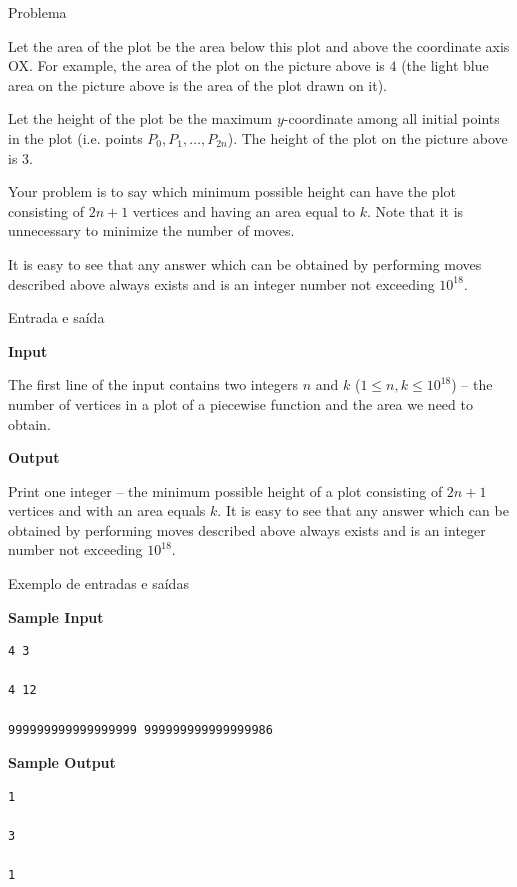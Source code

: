 \begin{frame}[fragile]{Problema}

Let the area of the plot be the area below this plot and above the coordinate axis OX. For example, the area of the plot on the picture above is $4$ (the light blue area on the picture above is the area of the plot drawn on it).

Let the height of the plot be the maximum $y$-coordinate among all initial points in the plot (i.e. points $P_0, P_1, \ldots, P_{2n}$). The height of the plot on the picture above is $3$.

Your problem is to say which minimum possible height can have the plot consisting of $2n+1$ vertices and having an area equal to $k$. Note that it is unnecessary to minimize the number of moves.

It is easy to see that any answer which can be obtained by performing moves described above always exists and is an integer number not exceeding $10^{18}$.

\end{frame}

\begin{frame}[fragile]{Entrada e saída}

\textbf{Input}

The first line of the input contains two integers $n$ and $k$ ($1\leq n,k\leq 10^{18}$) -- the number of vertices in a plot of a piecewise function and the area we need to obtain.

\textbf{Output}

Print one integer -- the minimum possible height of a plot consisting of $2n+1$ vertices and with an area equals $k$. It is easy to see that any answer which can be obtained by performing moves described above always exists and is an integer number not exceeding $10^{18}$.

\end{frame}

\begin{frame}[fragile]{Exemplo de entradas e saídas}

\begin{minipage}[t]{0.65\textwidth}
\textbf{Sample Input}
\begin{verbatim}
4 3

4 12

999999999999999999 999999999999999986
\end{verbatim}
\end{minipage}
\begin{minipage}[t]{0.3\textwidth}
\textbf{Sample Output}
\begin{verbatim}
1

3

1
\end{verbatim}
\end{minipage}
\end{frame}

